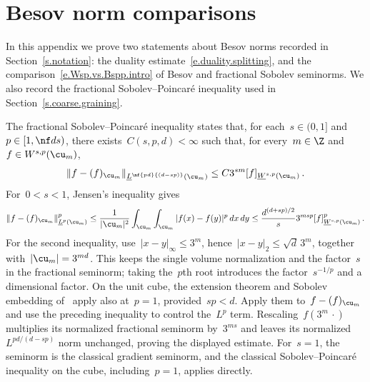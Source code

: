 \documentclass[11pt]{amsart}
\begin{document}
\section{Besov norm comparisons}
\label{s.Besov.norm.comparisons}

In this appendix we prove two statements about Besov norms recorded in Section~\ref{s.notation}: the duality estimate~\eqref{e.duality.splitting}, and the comparison~\eqref{e.Wsp.vs.Bspp.intro} of Besov and fractional Sobolev seminorms. We also record the fractional Sobolev--Poincar\'e inequality used in Section~\ref{s.coarse.graining}.

\smallskip

The fractional Sobolev--Poincar\'e inequality states that, for each~$s\in(0,1]$ and~$p\in[1,\nf ds)$, there exists~$C(s,p,d)<\infty$ such that, for every~$m\in\Z$ and~$f\in W^{s,p}(\cu_m)$,
\begin{equation*}
	\| f - (f)_{\cu_m} \|_{\underline{L}^{\nf{pd}{(d-sp)}} (\cu_m)}
	\leq
	C 3^{sm}  [f ]_{\underline{W}^{s,p}(\cu_m)}
	\,.
\end{equation*}
For~$0<s<1$, Jensen's inequality gives
\begin{equation*}
	\|f-(f)_{\cu_m}\|_{\underline L^p(\cu_m)}^p
	\leq\frac1{|\cu_m|^2}\int_{\cu_m}\int_{\cu_m}|f(x)-f(y)|^p\,dx\,dy
	\leq\frac{d^{(d+sp)/2}}s 3^{msp}
	[f]_{\underline W^{s,p}(\cu_m)}^p\,.
\end{equation*}
For the second inequality, use~$|x-y|_\infty\leq3^m$, hence~$|x-y|_2\leq\sqrt d\,3^m$, together with~$|\cu_m|=3^{md}$. This keeps the single volume normalization and the factor~$s$ in the fractional seminorm; taking the~$p$th root introduces the factor~$s^{-1/p}$ and a dimensional factor. On the unit cube, the extension theorem and Sobolev embedding of~\citet[Theorems~5.4 and~6.7]{DiNezzaPalatucciValdinoci} apply also at~$p=1$, provided~$sp<d$. Apply them to~$f-(f)_{\cu_m}$ and use the preceding inequality to control the~$L^p$ term. Rescaling~$f(3^m\,\cdot)$ multiplies its normalized fractional seminorm by~$3^{ms}$ and leaves its normalized~$L^{pd/(d-sp)}$ norm unchanged, proving the displayed estimate. For~$s=1$, the seminorm is the classical gradient seminorm, and the classical Sobolev--Poincar\'e inequality on the cube, including~$p=1$, applies directly.
\end{document}
